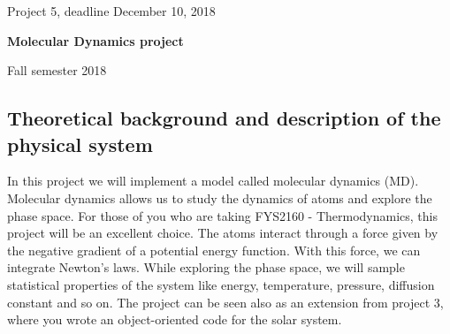 \documentclass[%
oneside,                 %
final,                   %
10pt]{article}
\begin{document}

\newcommand{\exercisesection}[1]{\subsection*{#1}}






\thispagestyle{empty}

\begin{center}
{\LARGE\bf
\begin{spacing}{1.25}
Project 5, deadline  December 10, 2018
\end{spacing}
}
\end{center}


\begin{center}
{\bf Molecular Dynamics project${}^{}$} \\ [0mm]
\end{center}

\begin{center}
\end{center}
    

\begin{center}
Fall semester 2018
\end{center}

\vspace{1cm}


\subsection{Theoretical background and description of the physical system}

In this project we will implement a model called molecular dynamics
(MD). Molecular dynamics allows us to study the dynamics of atoms and
explore the phase space. For those of you who are taking FYS2160 -
Thermodynamics, this project will be an excellent choice. The atoms
interact through a force given by the negative gradient of a potential
energy function. With this force, we can integrate Newton's
laws. While exploring the phase space, we will sample statistical
properties of the system like energy, temperature, pressure, diffusion
constant and so on.  The project can be seen also as an extension from project 3,
where you wrote an object-oriented code for the solar system. 
\end{document}
